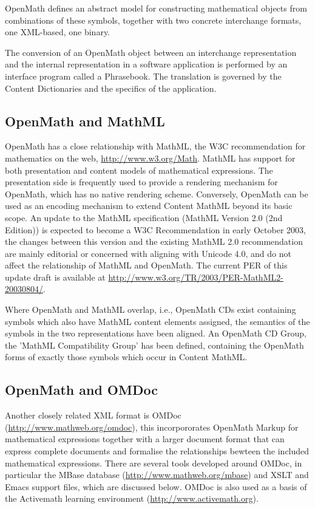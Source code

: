 \documentclass[keylogo]{openmath}
\begin{document}
OpenMath defines an abstract model for constructing mathematical
objects from combinations of these symbols, together with two concrete
interchange formats, one XML-based, one binary.

The conversion of an OpenMath object between an interchange
representation and the internal representation in a software
application is performed by an interface program called a Phrasebook.
The translation is governed by the Content Dictionaries and the
specifics of the application.



\subsection {OpenMath and MathML}

OpenMath has a close relationship with MathML, the W3C recommendation
for mathematics on the web, \url{http://www.w3.org/Math}.  MathML has
support for both presentation and content models of mathematical
expressions.  The presentation side is frequently used to provide a
rendering mechanism for OpenMath, which has no native rendering
scheme. Conversely, OpenMath can be used as an encoding mechanism to
extend Content MathML beyond its basic scope.
An update to the MathML specification (MathML Version 2.0 (2nd Edition))
is expected to become a W3C Recommendation in early October 2003,
the changes between this version and the existing MathML 2.0
recommendation are mainly editorial or concerned with aligning with
Unicode 4.0, and do not affect the relationship of MathML and OpenMath.
The current PER of this update draft is available at
\url{http://www.w3.org/TR/2003/PER-MathML2-20030804/}.

Where OpenMath and MathML overlap, i.e., OpenMath CDs exist containing
symbols which also have MathML content elements assigned, the
semantics of the symbols in the two representations have been aligned.
An OpenMath CD Group, the 'MathML Compatibility Group' has been
defined, containing the OpenMath forms of exactly those symbols which
occur in Content MathML. 

\subsection{OpenMath and OMDoc}
Another closely related XML format is OMDoc
(\url{http://www.mathweb.org/omdoc}), this incorpororates 
OpenMath Markup for mathematical expressions together with a larger
document format that can express complete documents and formalise the
relationships bewteen the included mathematical expressions.
There are several tools developed around OMDoc, in particular the MBase
database (\url{http://www.mathweb.org/mbase}) and XSLT and Emacs
support files, which are discussed below.
OMDoc is also used as a basis of the Activemath learning environment
(\url{http://www.activemath.org}).
\end{document}
